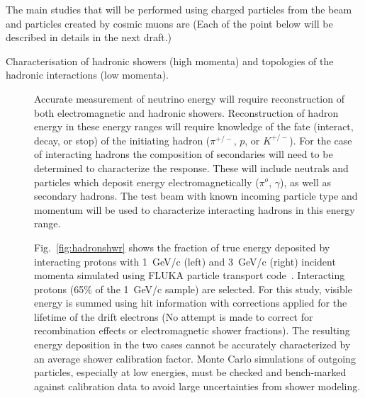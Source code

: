 The main studies that will be performed using charged particles from the beam and particles created by cosmic muons are
(Each of the point below will be described in details in the next draft.)
\begin{description}
\item [Characterisation of  hadronic showers (high momenta) and  topologies of the hadronic interactions (low momenta).]

Accurate measurement of neutrino energy will require reconstruction of both electromagnetic and hadronic showers. Reconstruction of hadron energy 
in these energy ranges will require knowledge of the fate (interact, decay, or stop) of the
initiating hadron ($\pi^{+/-}$, $p$, or $K^{+/-}$).
For the case of  interacting hadrons the composition of secondaries
will need to be determined to characterize the response. 
These will include neutrals and particles which 
deposit energy electromagnetically ($\pi^o$, $\gamma$), as well as
secondary hadrons.
The test beam with known incoming particle type and momentum will be used
to characterize interacting hadrons in this energy range.


Fig.~\ref{fig:hadronshwr} shows the fraction of true energy deposited by interacting protons with 1~GeV/c (left) and
3~GeV/c (right) incident momenta simulated using FLUKA particle transport code~\cite{fluka05}. 
Interacting protons (65\% of the 1~GeV/c sample) are selected.
For this study, visible energy is summed using hit information with corrections applied for the lifetime of 
the drift electrons (No attempt is made to correct for recombination effects or electromagnetic shower fractions). 
The resulting energy deposition in the two cases cannot be 
accurately characterized by an average shower calibration factor. Monte Carlo simulations of 
outgoing particles, especially at low energies, must be checked and bench-marked against calibration data to avoid
large uncertainties from shower modeling. 
\begin{figure}[h!]
  \centering


\end{figure}
\end{description}
